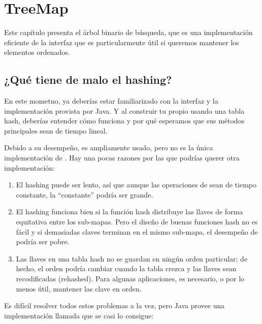 \documentclass[12pt]{book}
\theoremstyle{exercise}
\begin{document}
\chapter{TreeMap}


Este capítulo presenta el árbol binario de búsqueda, que es una implementación
eficiente de la interfaz  que es particularmente útil si queremos
mantener los elementos ordenados.

\section{¿Qué tiene de malo el hashing?}

En este mometno, ya deberías estar familiarizado con la interfaz  y
la implementación  provista por Java. Y al construir tu propio
 usando una tabla hash, deberías entender cómo funciona 
y por qué esperamos que sus métodos principales sean de tiempo lineal.


Debido a su desempeño,  es ampliamente usado, pero no es la
única implementación de . Hay una pocas razones por las que podrías
querer otra implementación:

\begin{enumerate}

\item
  El hashing puede ser lento, así que aunque las operaciones de  sean
  de tiempo constante, la ``constante'' podría ser grande.

\item
  El hashing funciona bien si la función hash distribuye las llaves de forma
  equitativa entre los sub-mapas. Pero el diseño de buenas funciones hash no
  es fácil y si demasiadas claves terminan en el mismo sub-mapa, el desempeño
  de  podría ser pobre.

\item
  Las llaves en una tabla hash no se guardan en ningún orden particular; de
  hecho, el orden podría cambiar cuando la tabla crezca y las llaves sean
  recodificadas (rehashed). Para algunas aplicaciones, es necesario, o por
  lo menos útil, mantener las clave en orden.

\end{enumerate}

Es difícil resolver todos estos problemas a la vez, pero
Java provee una implementación llamada  que se
casi lo consigue:
\end{document}
